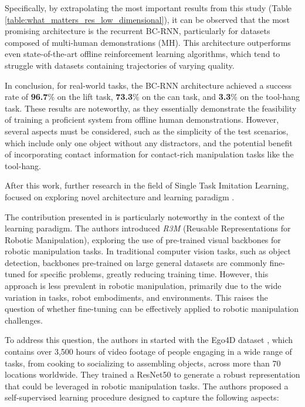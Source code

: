 Specifically, by extrapolating the most important results from this study (Table \ref{table:what_matters_res_low_dimensional}), it can be observed that the most promising architecture is the recurrent BC-RNN, particularly for datasets composed of multi-human demonstrations (MH). This architecture outperforms even state-of-the-art offline reinforcement learning algorithms, which tend to struggle with datasets containing trajectories of varying quality.

In conclusion, for real-world tasks, the BC-RNN architecture achieved a success rate of \textbf{96.7}\% on the lift task, \textbf{73.3}\% on the can task, and \textbf{3.3}\% on the tool-hang task. These results are noteworthy, as they essentially demonstrate the feasibility of training a proficient system from offline human demonstrations. However, several aspects must be considered, such as the simplicity of the test scenarios, which include only one object without any distractors, and the potential benefit of incorporating contact information for contact-rich manipulation tasks like the tool-hang.


After this work, further research in the field of Single Task Imitation Learning, focused on exploring novel architecture \cite{shafiullah2022behavior} and learning paradigm \cite{nair2022r3m,cheng2023diffusion,shi2023waypoint}. 

The contribution presented in \cite{nair2022r3m} is particularly noteworthy in the context of the learning paradigm. The authors introduced \textit{R3M} (Reusable Representations for Robotic Manipulation), exploring the use of pre-trained visual backbones for robotic manipulation tasks. In traditional computer vision tasks, such as object detection, backbones pre-trained on large general datasets are commonly fine-tuned for specific problems, greatly reducing training time. However, this approach is less prevalent in robotic manipulation, primarily due to the wide variation in tasks, robot embodiments, and environments. This raises the question of whether fine-tuning can be effectively applied to robotic manipulation challenges.

To address this question, the authors in \cite{nair2022r3m} started with the Ego4D dataset \cite{grauman2022ego4d}, which contains over 3,500 hours of video footage of people engaging in a wide range of tasks, from cooking to socializing to assembling objects, across more than 70 locations worldwide. They trained a ResNet50 \cite{resnet} to generate a robust representation that could be leveraged in robotic manipulation tasks. The authors proposed a self-supervised learning procedure designed to capture the following aspects:

